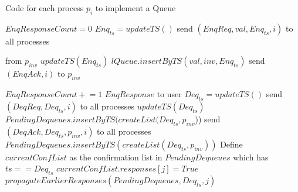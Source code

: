 \documentclass[a4paper,anonymous,USenglish]{lipics-v2021}
\theoremstyle{definition}
\newcommand{\pluseq}{\mathrel{+}=}
\begin{document}
\begin{algorithm}
  \caption{Code for each process $p_i$ to implement a Queue}\label{alg:fifo}
  \begin{algorithmic}[1]
    \label{fifoline:invEnq}
      \State $EnqResponseCount = 0$ 
      \State $Enq_{ts} = updateTS()$ \label{fifoline:enqTS} 
      \State send $(EnqReq, val, Enq_{ts}, i)$ to all processes\label{fifoline:sendEnqReq}
    \EndFunction

     from $p_{inv}$
      \State $updateTS(Enq_{ts})$ \label{fifoline:enqReqTSUpdate} 
      \State $lQueue.insertByTS(val, inv, Enq_{ts})$\label{fifoline:executeEnq} 
      \State send $(EnqAck, i)$ to $p_{inv}$ \label{fifoline:sendEnqAck} 
    \EndFunction

      \State $EnqResponseCount \pluseq 1$
        \Return $EnqResponse$ to user\label{fifoline:enqReturn} 
      \EndIf
    \EndFunction \label{fifoline:finishEnq}
%
      \State $Deq_{ts} = updateTS()$ \label{fifoline:deqTS}
      \State send $(DeqReq, Deq_{ts}, i)$ to all processes \label{fifoline:sendDeqReq}
    \EndFunction
%
    \State $updateTS(Deq_{ts})$ \label{fifoline:deqReqTSUpdate}
      \State $PendingDequeues.insertByTS(createList(Deq_{ts}, p_{inv}$))\label{fifoline:savePendingDeq}
      \EndIf
      \State send $(DeqAck, Deq_{ts}, p_{inv}, i)$ to all processes \label{fifoline:sendSafetyFlag}\label{fifoline:sendDeqAck}
    \EndFunction
%
        \State $PendingDequeues.insertByTS(createList(Deq_{ts}, p_{inv}))$
      \EndIf
      \State Define $currentConfList$ as the confirmation list in $PendingDequeues$ which has $ts == Deq_{ts}$
      \State $currentConfList.responses[j] = True$ \label{fifoline:setResponse}
      \State $propagateEarlierResponses(PendingDequeues, Deq_{ts}, j)$ \label{fifoline:propagateEarlier} 


\end{algorithmic}
\end{algorithm}
\end{document}
